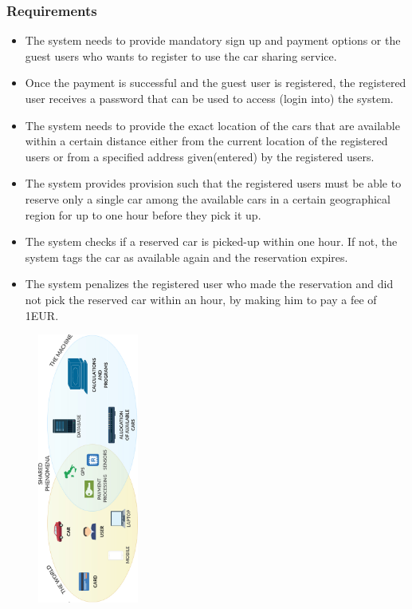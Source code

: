 \begin{frame}
	\fontsize{7.5}{9}
	\frametitle{Requirements}
	\begin{itemize}
		\item The system needs to provide mandatory sign up and payment options or the guest users who wants to register to use the car sharing service.
		\item Once the payment is successful and the guest user is registered, the registered user receives a password that can be used to access (login into) the system.
		\item The system needs to provide the exact location of the cars that are available within a certain distance either from the current location of the registered users or from a specified address given(entered) by the registered users.
		\item The system provides provision such that the registered users must be able to reserve only a single car among the available cars in a certain geographical region for up to one hour before they pick it up.
		\item The system checks if a reserved car is picked-up within one hour. If not, the system tags the car as available again and the reservation expires.
		\item The system penalizes the registered user who made the reservation and did not pick the reserved car within an hour, by making him to pay a fee of 1EUR.
	\end{itemize}
	
	\vspace*{-0.3cm}
	\begin{figure}[H]
		\centering
		\includegraphics[width=3.3cm,keepaspectratio,angle=270]{figures/world_and_machine.eps}
		\label{fig:world_and_machine}
	\end{figure}
\end{frame}

